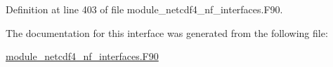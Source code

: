 Definition at line 403 of file module\+\_\+netcdf4\+\_\+nf\+\_\+interfaces.\+F90.



The documentation for this interface was generated from the following file\+:\begin{DoxyCompactItemize}
\item 
\hyperlink{module__netcdf4__nf__interfaces_8F90}{module\+\_\+netcdf4\+\_\+nf\+\_\+interfaces.\+F90}\end{DoxyCompactItemize}

